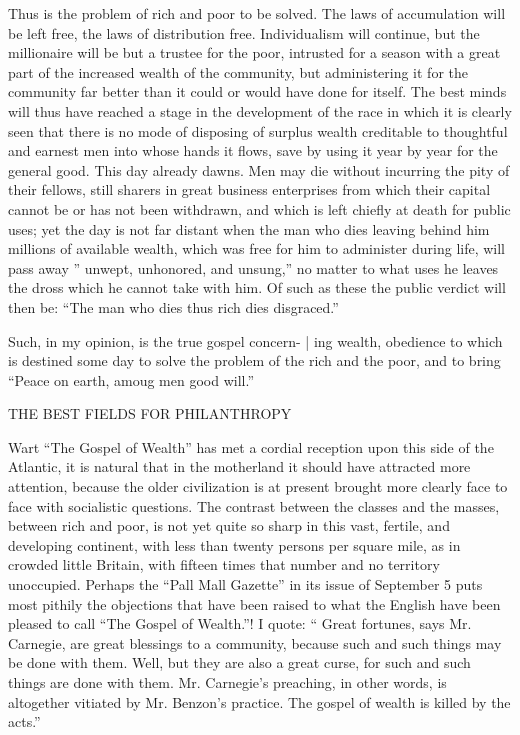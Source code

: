 \documentclass[11pt,openany]{book}
\begin{document}
Thus is the problem of rich and poor to be solved. The laws of accumulation will be left free, the laws of distribution free. Individualism will continue, but the millionaire will be but a trustee for the poor, intrusted for a season with a great part of the increased wealth of the community, but administering it for the community far better than it could or would have done for itself. The best minds will thus have reached a stage in the development of the race in which it is clearly seen that there is no mode of disposing of surplus wealth creditable to thoughtful and earnest men into whose hands it flows, save by using it year by year for the general good. This day already dawns. Men may die without incurring the pity of their fellows, still sharers in great business enterprises from which their capital cannot be or has not been withdrawn, and which is left chiefly at death for public uses; yet the day is not far distant when the man who dies leaving behind him millions of available wealth, which was free for him to administer during life, will pass away '' unwept, unhonored, and unsung,'' no matter to what uses he leaves the dross which he cannot take with him. Of such as these the public verdict will then be: ``The man who dies thus rich dies disgraced.''

Such, in my opinion, is the true gospel concern- | ing wealth, obedience to which is destined some day to solve the problem of the rich and the poor, and to bring ``Peace on earth, amoug men good will.''

THE BEST FIELDS FOR PHILANTHROPY

Wart ``The Gospel of Wealth'' has met a cordial reception upon this side of the Atlantic, it is natural that in the motherland it should have attracted more attention, because the older civilization is at present brought more clearly face to face with socialistic questions. The contrast between the classes and the masses, between rich and poor, is not yet quite so sharp in this vast, fertile, and developing continent, with less than twenty persons per square mile, as in crowded little Britain, with fifteen times that number and no territory unoccupied. Perhaps the ``Pall Mall Gazette'' in its issue of September 5 puts most pithily the objections that have been raised to what the English have been pleased to call ``The Gospel of Wealth.''! I quote: `` Great fortunes, says Mr. Carnegie, are great blessings to a community, because such and such things may be done with them. Well, but they are also a great curse, for such and such things are done with them. Mr. Carnegie's preaching, in other words, is altogether vitiated by Mr. Benzon's practice. The gospel of wealth is killed by the acts.''
\end{document}
